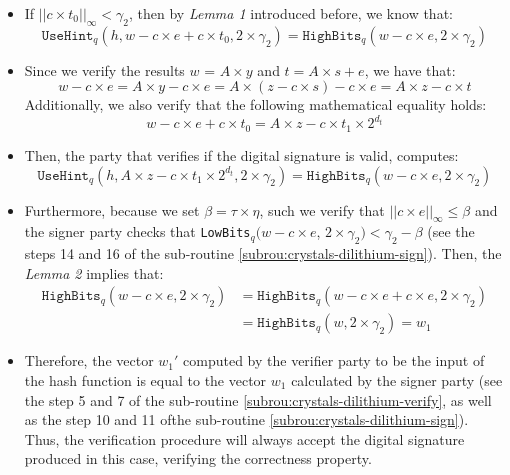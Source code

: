 \documentclass[runningheads]{llncs}
\numberwithin{equation}{section}
\begin{document}
    \begin{itemize}
        \item If ${\big|\big| c \times {t}_{0} \big|\big|}_{\infty} < {\gamma}_{2}$, then by \textit{Lemma 1} introduced before, we know that:
        $$ \mathrm{\texttt{UseHint}}{}_{q}(h, w - c \times e + c \times {t}_{0}, 2 \times {\gamma}_{2}) = \mathrm{\texttt{HighBits}}{}_{q}(w - c \times e, 2 \times {\gamma}_{2}) $$
        
        \item Since we verify the results $w$ = $A \times y$ and $t = A \times s + e$, we have that:
        $$ w - c \times e = A \times y - c \times e = A \times (z - c \times s) - c \times e = A \times z - c \times t$$
        Additionally, we also verify that the following mathematical equality holds:
        $$ w - c \times e + c \times {t}_{0} = A \times z - c \times {t}_{1} \times {2}^{{d}_{t}} $$
        \item Then, the party that verifies if the digital signature is valid, computes:
        $$ \mathrm{\texttt{UseHint}}{}_{q}(h, A \times z - c \times {t}_{1} \times {2}^{{d}_{t}}, 2 \times {\gamma}_{2}) = \mathrm{\texttt{HighBits}}{}_{q}(w - c \times e, 2 \times {\gamma}_{2}) $$
        
        \item Furthermore, because we set $\beta = \tau \times \eta$, such we verify that ${||c \times e||}_{\infty} \leq \beta$ and the signer party checks that \texttt{LowBits}${}_{q}$$(w - c \times e$, $2 \times {\gamma}_{2}) < {\gamma}_{2} - \beta$ (see the steps 14 and 16 of the sub-routine \ref{subrou:crystals-dilithium-sign}). Then, the \textit{Lemma 2} implies that:
        \begin{equation*} \label{eq1}
            \begin{split}
                \mathrm{\texttt{HighBits}}{}_{q}(w - c \times e, 2 \times {\gamma}_{2}) & = \mathrm{\texttt{HighBits}}{}_{q}(w - c \times e + c \times e, 2 \times {\gamma}_{2})\\
                 & = \mathrm{\texttt{HighBits}}{}_{q}(w , 2 \times {\gamma}_{2}) = {w}_{1}
            \end{split}
        \end{equation*}
        
        \item Therefore, the vector ${w}_{1}'$ computed by the verifier party to be the input of the hash function is equal to the vector ${w}_{1}$ calculated by the signer party (see the step 5 and 7 of the sub-routine \ref{subrou:crystals-dilithium-verify}, as well as the step 10 and 11 of\break the sub-routine \ref{subrou:crystals-dilithium-sign}). Thus, the verification procedure will always accept the digital signature produced in this case, verifying the correctness property.
    \end{itemize}
\end{document}

